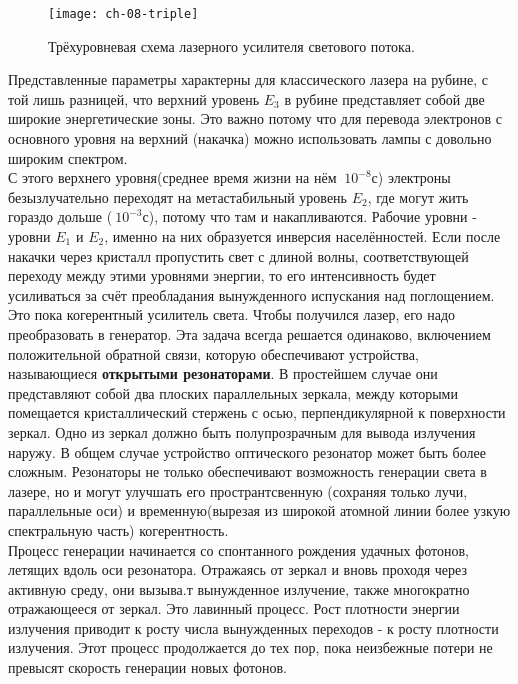 \documentclass[__main__.tex]{subfiles}
\begin{document}
\begin{wrapfigure}{l!}{.3\linewidth}
	\texttt{[image: ch-08-triple]}
	\caption{Трёхуровневая схема лазерного усилителя светового потока.}
	\label{ch-08-triple}
\end{wrapfigure}
Представленные параметры характерны для классического лазера на рубине, с той лишь разницей, что верхний уровень $E_3$ в рубине представляет собой две широкие энергетические зоны. Это важно потому что для перевода электронов с основного уровня на верхний (накачка) можно использовать лампы с довольно широким спектром.\\
С этого верхнего уровня(среднее время жизни на нём $~10^{-8}$с) электроны безызлучательно переходят на метастабильный уровень $E_2$, где могут жить гораздо дольше ($~10^{-3}$с), потому что там и накапливаются. Рабочие уровни - уровни $E_1$ и $E_2$, именно на них образуется инверсия населённостей. Если после накачки через кристалл пропустить свет с длиной волны, соответствующей переходу между этими уровнями энергии, то его интенсивность будет усиливаться за счёт преобладания вынужденного испускания над поглощением.\\
Это пока когерентный усилитель света. Чтобы получился лазер, его надо преобразовать в генератор. Эта задача всегда решается одинаково, включением положительной обратной связи, которую обеспечивают устройства, называющиеся \textbf{открытыми резонаторами}.
В простейшем случае они представляют собой два плоских параллельных зеркала, между которыми помещается кристаллический стержень с осью, перпендикулярной к поверхности зеркал. Одно из зеркал должно быть полупрозрачным для вывода излучения наружу. В общем случае устройство оптического резонатор может быть более сложным. Резонаторы не только обеспечивают возможность генерации света в лазере, но и могут улучшать его пространтсвенную (сохраняя только лучи, параллельные оси) и  временную(вырезая из широкой атомной линии более узкую спектральную часть) когерентность.\\
Процесс генерации начинается со спонтанного рождения удачных фотонов, летящих вдоль оси резонатора. Отражаясь от зеркал и вновь проходя через активную среду, они вызыва.т вынужденное излучение, также многократно отражающееся от зеркал. Это лавинный процесс. Рост плотности энергии излучения приводит к росту числа вынужденных переходов - к росту плотности излучения. Этот процесс продолжается до тех пор, пока неизбежные потери не превысят скорость генерации новых фотонов.
\end{document}
